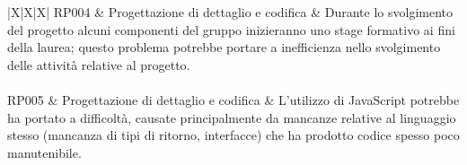 \begin{tabularx}{\textwidth}{|X|X|X|}
     	RP004 & Progettazione di dettaglio e codifica & Durante lo svolgimento del progetto alcuni componenti del gruppo inizieranno uno stage formativo ai fini della laurea; questo problema potrebbe portare a inefficienza nello svolgimento delle attività relative al progetto. \\
     	\hline
     		 \\
     \hline
     RP005 & Progettazione di dettaglio e codifica & L'utilizzo di JavaScript potrebbe ha portato a difficoltà, causate principalmente da mancanze relative al linguaggio stesso (mancanza di tipi di ritorno, interfacce) che ha prodotto codice spesso poco manutenibile.\\
     \hline
      \\
 	\hline
 	\caption{Attualizzazione dell'analisi dei rischi}
\end{tabularx}